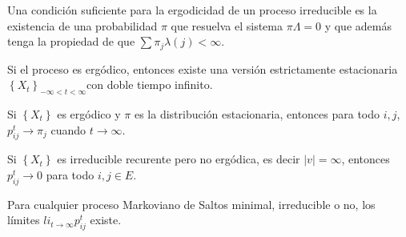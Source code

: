 \begin{Cor}\label{Cor.4.4}
Una condici\'on suficiente para la ergodicidad de un proceso irreducible es la existencia de una probabilidad $\pi$ que resuelva el sistema $\pi\Lambda=0$ y que adem\'as tenga la propiedad de que $\sum\pi_{j}\lambda\left(j\right)<\infty$.
\end{Cor}

\begin{Prop}
Si el proceso es erg\'odico, entonces existe una versi\'on estrictamente estacionaria
$\left\{X_{t}\right\}_{-\infty<t<\infty}$con doble tiempo
infinito.
\end{Prop}

\begin{Teo}
Si $\left\{X_{t}\right\}$ es erg\'odico y $\pi$ es la distribuci\'on estacionaria, entonces para todo $i,j$, $p_{ij}^{t}\rightarrow\pi_{j}$ cuando $t\rightarrow\infty$.
\end{Teo}

\begin{Cor}
Si $\left\{X_{t}\right\}$ es irreducible recurente pero no erg\'odica, es decir $|v|=\infty$, entonces $p_{ij}^{t}\rightarrow0$ para todo $i,j\in E$.
\end{Cor}

\begin{Cor}
Para cualquier proceso Markoviano de Saltos minimal, irreducible o
no, los l\'imites $li_{t\rightarrow\infty}p_{ij}^{t}$ existe.
\end{Cor}



